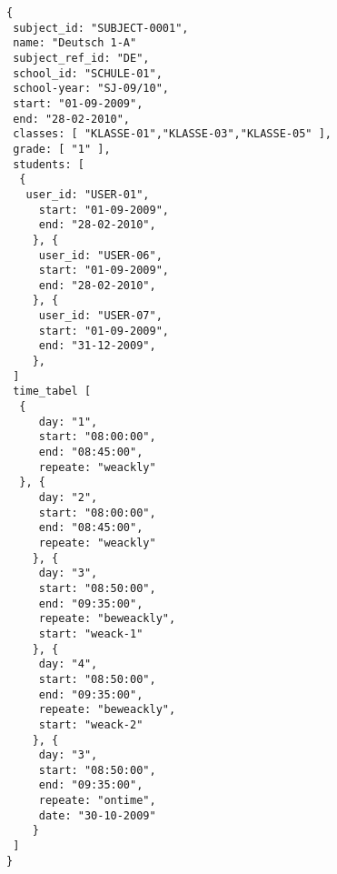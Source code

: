 
\begin{lstlisting}[caption={Beispiel 1 Schüler},frame=tlrb]
{
 subject_id: "SUBJECT-0001",
 name: "Deutsch 1-A"
 subject_ref_id: "DE",
 school_id: "SCHULE-01",
 school-year: "SJ-09/10",
 start: "01-09-2009",
 end: "28-02-2010",
 classes: [ "KLASSE-01","KLASSE-03","KLASSE-05" ],
 grade: [ "1" ],
 students: [
  { 
   user_id: "USER-01",
	 start: "01-09-2009",
	 end: "28-02-2010",
	}, { 
	 user_id: "USER-06",
	 start: "01-09-2009",
	 end: "28-02-2010",
	}, { 
	 user_id: "USER-07",
	 start: "01-09-2009",
	 end: "31-12-2009",
	},
 ]
 time_tabel [
  {
	 day: "1",
	 start: "08:00:00",
	 end: "08:45:00",
	 repeate: "weackly"
  }, {
	 day: "2",
	 start: "08:00:00",
	 end: "08:45:00",
	 repeate: "weackly"
	}, {
	 day: "3",
	 start: "08:50:00",
	 end: "09:35:00",
	 repeate: "beweackly",
	 start: "weack-1"
	}, {
	 day: "4",
	 start: "08:50:00",
	 end: "09:35:00",
	 repeate: "beweackly",
	 start: "weack-2"
	}, {
	 day: "3",
	 start: "08:50:00",
	 end: "09:35:00",
	 repeate: "ontime",
	 date: "30-10-2009"
	}	 
 ]
}
\end{lstlisting}